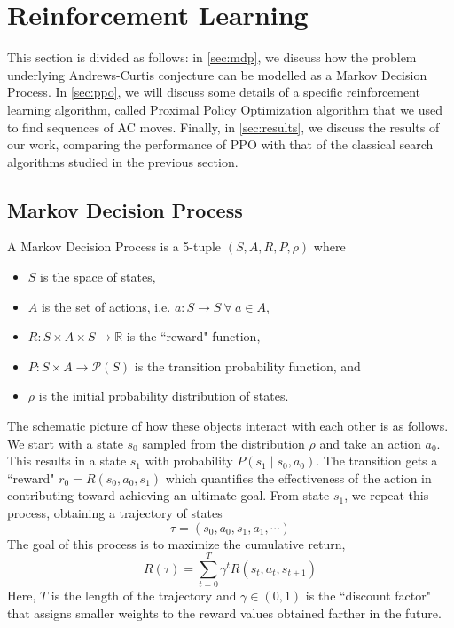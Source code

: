 
\section{Reinforcement Learning}



This section is divided as follows: in \autoref{sec:mdp}, we discuss how the problem underlying Andrews-Curtis conjecture can be modelled as a Markov Decision Process. In \autoref{sec:ppo}, we will discuss some details of a specific reinforcement learning algorithm, called Proximal Policy Optimization algorithm that we used to find sequences of AC moves. Finally, in \autoref{sec:results}, we discuss the results of our work, comparing the performance of PPO with that of the classical search algorithms studied in the previous section. 

\subsection{Markov Decision Process} \label{sec:mdp}

A Markov Decision Process is a 5-tuple $(S, A, R, P, \rho)$ where 
\begin{itemize}
	\item $S$ is the space of states, 
	\item $A$ is the set of actions, i.e. $a \colon S \to S \ \forall \ a \in A$, 
	\item $R \colon S \times A \times S \to \mathbb{R}$ is the ``reward" function, 
	\item $P \colon S \times A \to \mathcal{P}(S)$ is the transition probability function, and 
	\item $\rho$ is the initial probability distribution of states. 
\end{itemize}

The schematic picture of how these objects interact with each other is as follows. We start with a state $s_0$ sampled from the distribution $\rho$ and take an action $a_0$. This results in a state $s_1$ with probability $P(s_1 \mid s_0, a_0) $. The transition gets a ``reward" $r_0 = R(s_0, a_0, s_1)$ which quantifies the effectiveness of the action in contributing toward achieving an ultimate goal. From state $s_1$, we repeat this process, obtaining a trajectory of states
\[
\tau = \left( s_0, a_0, s_1, a_1, \cdots \right)
\]
The goal of this process is to maximize the cumulative return,
\[
R(\tau) = \sum\limits_{t=0}^{T} \gamma^t R(s_t, a_t, s_{t+1})
\]
Here, $T$ is the length of the trajectory and $\gamma \in \left(0, 1 \right)$ is the ``discount factor" that assigns smaller weights to the reward values obtained farther in the future. 
\newline

